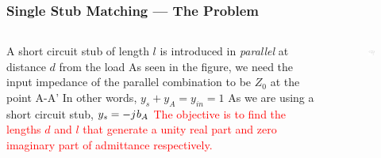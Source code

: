 \documentclass[10pt, compress]{beamer}
\renewcommand{\j}{{j}\mkern1mu} %
\begin{document}
\begin{frame}
    \frametitle{Single Stub Matching — The Problem}
    \begin{columns}[]
        \begin{column}[]{.5\textwidth}
            \begin{outline}
                \1 A short circuit stub of length $l$ is introduced in \textit{parallel} at distance $d$ from the load
                \1 As seen in the figure, we need the input impedance of the parallel combination to be $Z_0$ at the point A-A'
                \1 In other words, $y_s + y_A = y_{in} = 1$
                \1 As we are using a short circuit stub, $y_s = - \j b_A$
                \1 \textcolor{red}{The objective is to find the lengths $d$ and $l$ that generate a unity real part and zero imaginary part of admittance respectively.}
            \end{outline}
        \end{column}
        \begin{column}[]{.5\textwidth}
            \begin{figure}[]
                \centering
                \includegraphics[width=.9\textwidth]{tline_single_stub.pdf}
            \end{figure}
        \end{column}
    \end{columns}
\end{frame}
\end{document}
